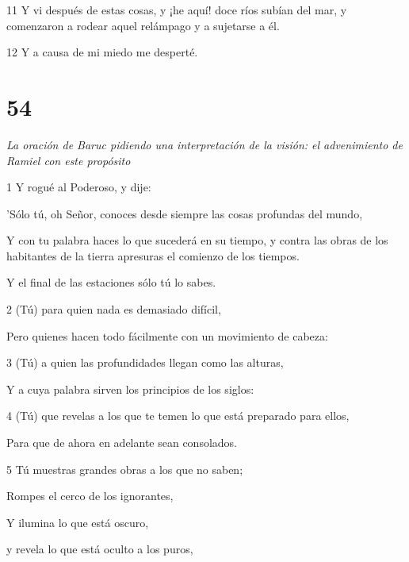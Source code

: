 \par 11 Y vi después de estas cosas, y ¡he aquí! doce ríos subían del mar, y comenzaron a rodear aquel relámpago y a sujetarse a él.

\par 12 Y a causa de mi miedo me desperté.

\chapter{54}

\par \textit{La oración de Baruc pidiendo una interpretación de la visión: el advenimiento de Ramiel con este propósito}


\par 1 Y rogué al Poderoso, y dije:

'Sólo tú, oh Señor, conoces desde siempre las cosas profundas del mundo,

Y con tu palabra haces lo que sucederá en su tiempo, y contra las obras de los habitantes de la tierra apresuras el comienzo de los tiempos.

\par Y el final de las estaciones sólo tú lo sabes.

\par 2 (Tú) para quien nada es demasiado difícil,

\par Pero quienes hacen todo fácilmente con un movimiento de cabeza:

\par 3 (Tú) a quien las profundidades llegan como las alturas,

\par Y a cuya palabra sirven los principios de los siglos:

\par 4 (Tú) que revelas a los que te temen lo que está preparado para ellos,

\par Para que de ahora en adelante sean consolados.

\par 5 Tú muestras grandes obras a los que no saben;

\par Rompes el cerco de los ignorantes,

\par Y ilumina lo que está oscuro,

\par y revela lo que está oculto a los puros,

